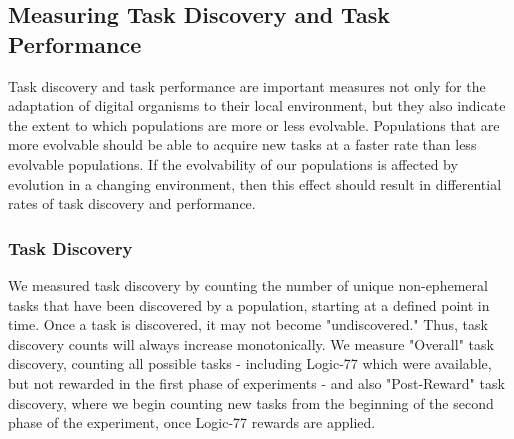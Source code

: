 \documentclass[PhD]{msu-thesis}
\begin{document}
\subsection{Measuring Task Discovery and Task Performance}
Task discovery and task performance are important measures not only for the adaptation of digital organisms to their local environment, but they also indicate the extent to which populations are more or less evolvable. Populations that are more evolvable should be able to acquire new tasks at a faster rate than less evolvable populations. If the evolvability of our populations is affected by evolution in a changing environment, then this effect should result in differential rates of task discovery and performance.

\subsubsection{Task Discovery}
We measured task discovery by counting the number of unique non-ephemeral tasks that have been discovered by a population, starting at a defined point in time. Once a task is discovered, it may not become "undiscovered." Thus, task discovery counts will always increase monotonically. We measure "Overall" task discovery, counting all possible tasks - including Logic-77 
which were available, but not rewarded in the first phase of experiments - and also "Post-Reward" task discovery, where we begin counting new tasks from the beginning of the second phase of the experiment, once Logic-77 rewards are applied. 
\end{document}
